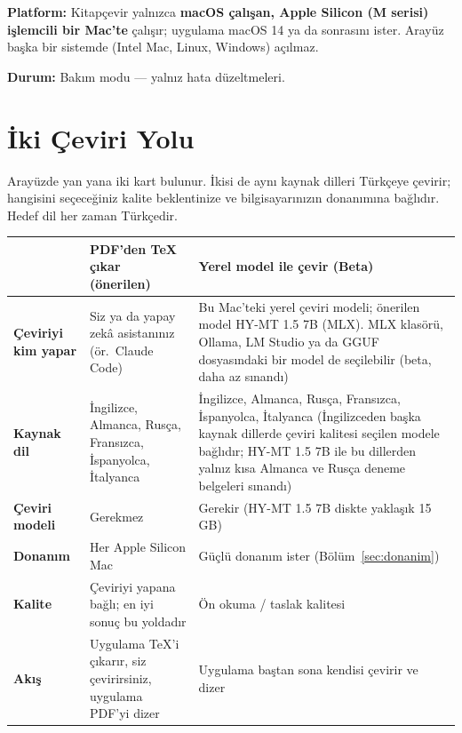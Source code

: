 \documentclass[11pt,a4paper]{article}
\begin{document}
\begin{notkutu}
\textbf{Platform:} Kitapçevir yalnızca \textbf{macOS çalışan, Apple Silicon
(M serisi) işlemcili bir Mac'te} çalışır; uygulama macOS 14 ya da sonrasını
ister. Arayüz başka bir sistemde (Intel Mac, Linux, Windows) açılmaz.
\end{notkutu}

\begin{notkutu}
\textbf{Durum:} Bakım modu --- yalnız hata düzeltmeleri.
\end{notkutu}

\section{İki Çeviri Yolu}\label{sec:ikiyol}

Arayüzde yan yana iki kart bulunur. İkisi de aynı kaynak dilleri Türkçeye
çevirir; hangisini seçeceğiniz kalite beklentinize ve bilgisayarınızın
donanımına bağlıdır. Hedef dil her zaman Türkçedir.

\vspace{6pt}
\renewcommand{\arraystretch}{1.4}
\noindent\begin{tabular}{@{}L{3.0cm}L{6.1cm}L{5.8cm}@{}}
\toprule
 & \textbf{\color{vurgu}PDF'den TeX çıkar} (önerilen) & \textbf{Yerel model ile çevir} (Beta) \\
\midrule
\textbf{Çeviriyi kim yapar} & Siz ya da yapay zekâ asistanınız (ör.\ Claude Code) & Bu Mac'teki yerel çeviri modeli; önerilen model HY-MT 1.5 7B (MLX). MLX klasörü, Ollama, LM Studio ya da GGUF dosyasındaki bir model de seçilebilir (beta, daha az sınandı) \\
\textbf{Kaynak dil} & İngilizce, Almanca, Rusça, Fransızca, İspanyolca, İtalyanca & İngilizce, Almanca, Rusça, Fransızca, İspanyolca, İtalyanca (İngilizceden başka kaynak dillerde çeviri kalitesi seçilen modele bağlıdır; HY-MT 1.5 7B ile bu dillerden yalnız kısa Almanca ve Rusça deneme belgeleri sınandı) \\
\textbf{Çeviri modeli} & Gerekmez & Gerekir (HY-MT 1.5 7B diskte yaklaşık 15 GB) \\
\textbf{Donanım} & Her Apple Silicon Mac & Güçlü donanım ister (Bölüm~\ref{sec:donanim}) \\
\textbf{Kalite} & Çeviriyi yapana bağlı; en iyi sonuç bu yoldadır & Ön okuma / taslak kalitesi \\
\textbf{Akış} & Uygulama TeX'i çıkarır, siz çevirirsiniz, uygulama PDF'yi dizer & Uygulama baştan sona kendisi çevirir ve dizer \\
\bottomrule
\end{tabular}
\vspace{8pt}
\end{document}
